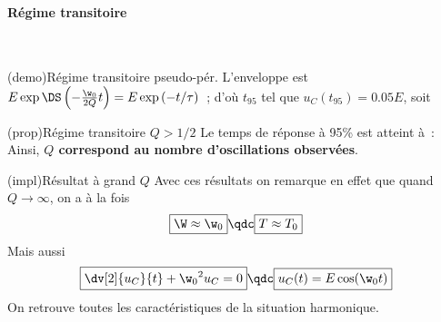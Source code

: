 \documentclass[../../main/main.tex]{subfiles}
\begin{document}
\paragraph{Régime transitoire}
~ \smallbreak

\begin{tcb*}[label=demo:transipseudo](demo){Régime transitoire pseudo-pér.}
	L'enveloppe est $E\exp \DS \left( -\frac{\w_0}{2Q}t \right) = E
		\exp \left( -t/\tau \right)$~; d'où $t_{95}$ tel que $u_C (t_{95})
		= \num{0.05}E$, soit
\end{tcb*}

\begin{tcb*}[label=prop:transipseudo, sidebyside]
	(prop){Régime transitoire $Q > 1/2$}
	Le temps de réponse à 95\% est atteint à~:
	\vspace{-15pt}
	\tcblower
	Ainsi, \textbf{$Q$ correspond au nombre d'oscillations observées}.
\end{tcb*}

\begin{tcb}[label=impl:pseudograndQ](impl){Résultat à grand $Q$}
	Avec ces résultats on remarque en effet que quand $Q \rightarrow \infty$, on
	a à la fois
	\begin{equation*}
		\boxed{\W \approx \w_0} \qdc \boxed{T \approx T_0}
	\end{equation*}
	Mais aussi
	\begin{equation*}
		\boxed{\dv[2]{u_C}{t} + \w_0{}^2u_C = 0} \qdc \boxed{u_C(t) = E\cos(\w_0t)}
	\end{equation*}
	On retrouve toutes les caractéristiques de la situation harmonique.
\end{tcb}
\end{document}
